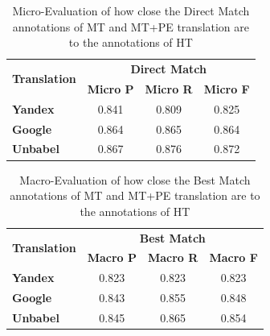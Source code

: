 \begin{table}[!htp]
\centering
\begin{tabular}{@{}lccc@{}}
\toprule
\multicolumn{1}{c}{\multirow{2}{*}{\textbf{Translation}}} & \multicolumn{3}{c}{\textbf{Direct Match}}                            \\ \cmidrule(l){2-4}
\multicolumn{1}{c}{}          & \textbf{Micro P}     & \textbf{Micro R}      & \textbf{Micro F}          \\ \midrule
\textbf{Yandex}   & 0.841                & 0.809                 & 0.825                   \\ 

\textbf{Google}   & 0.864                & 0.865                 & 0.864                   \\ 

\textbf{Unbabel}  & 0.867                & 0.876                 & 0.872         \\ \bottomrule 

\end{tabular}%
\caption{Micro-Evaluation of how close the Direct Match annotations of MT and MT+PE translation are to the annotations of HT}
\label{table: Results Direct Match Micro}
\end{table}


\begin{table}[!htp]
\centering
\begin{tabular}{@{}lccc@{}}
\toprule
\multicolumn{1}{c}{\multirow{2}{*}{\textbf{Translation}}} & \multicolumn{3}{c}{\textbf{Best Match}}                            \\ \cmidrule(l){2-4}
\multicolumn{1}{c}{}          & \textbf{Macro P}     & \textbf{Macro R}      & \textbf{Macro F}          \\ \midrule
\textbf{Yandex}   & 0.823                & 0.823                 & 0.823                   \\ 

\textbf{Google}   & 0.843                & 0.855                 & 0.848                   \\ 

\textbf{Unbabel}  & 0.845                & 0.865                 & 0.854         \\ \bottomrule 

\end{tabular}%
\caption{Macro-Evaluation of how close the Best Match annotations of MT and MT+PE translation are to the annotations of HT}
\label{table: Results Best Match Macro}
\end{table}


